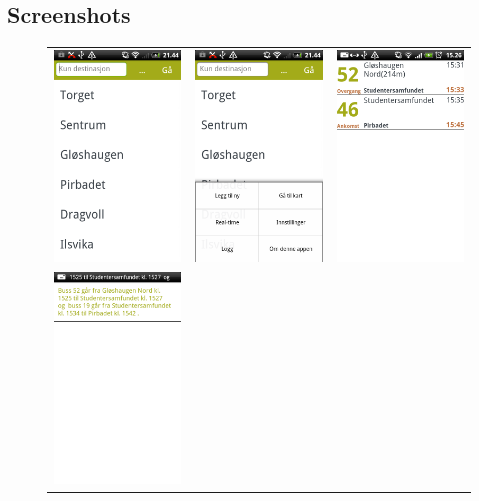 \subsection{Screenshots}
\begin{figure}
\begin{tabular}{ccc}
\includegraphics[width=0.27\linewidth]{Results/startscreen.png} & 
\includegraphics[width=0.27\linewidth]{Results/menu.png} &
\includegraphics[width=0.27\linewidth]{Results/answer.png} \\
\includegraphics[width=0.27\linewidth]{Results/textanswer} & 

\end{tabular}
\end{figure}

